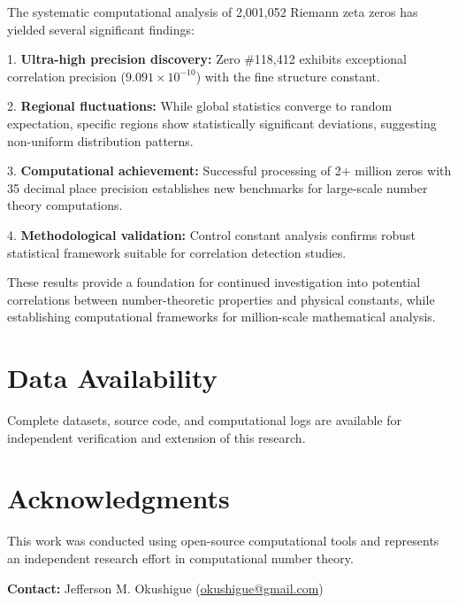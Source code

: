 \documentclass[12pt, a4paper]{article}
\begin{document}
The systematic computational analysis of 2,001,052 Riemann zeta zeros has yielded several significant findings:

1. \textbf{Ultra-high precision discovery:} Zero \#118,412 exhibits exceptional correlation precision ($9.091 \times 10^{-10}$) with the fine structure constant.

2. \textbf{Regional fluctuations:} While global statistics converge to random expectation, specific regions show statistically significant deviations, suggesting non-uniform distribution patterns.

3. \textbf{Computational achievement:} Successful processing of 2+ million zeros with 35 decimal place precision establishes new benchmarks for large-scale number theory computations.

4. \textbf{Methodological validation:} Control constant analysis confirms robust statistical framework suitable for correlation detection studies.

These results provide a foundation for continued investigation into potential correlations between number-theoretic properties and physical constants, while establishing computational frameworks for million-scale mathematical analysis.

\section{Data Availability}
Complete datasets, source code, and computational logs are available for independent verification and extension of this research.

\section{Acknowledgments}
This work was conducted using open-source computational tools and represents an independent research effort in computational number theory.

\textbf{Contact:} Jefferson M. Okushigue (\href{mailto:okushigue@gmail.com}{okushigue@gmail.com})
\end{document}
